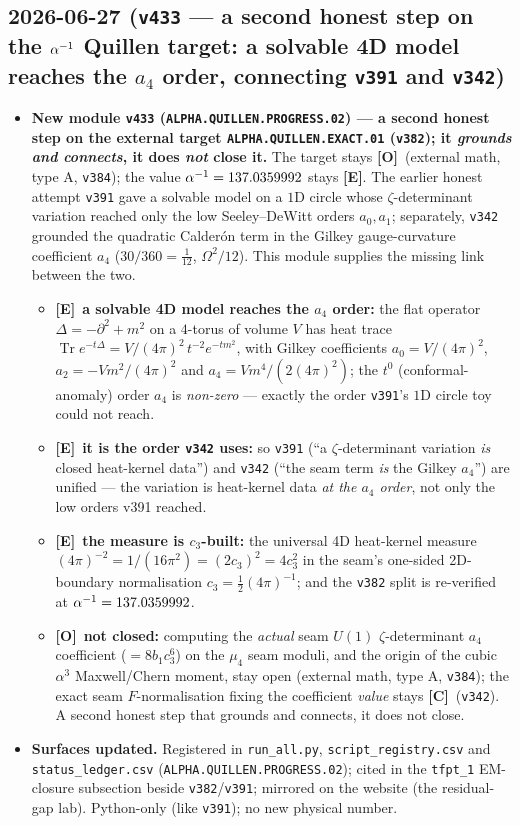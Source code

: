 \documentclass[11pt]{article}
\providecommand{\mE}{\textbf{[E]}}\providecommand{\mC}{\textbf{[C]}}
\providecommand{\mO}{\textbf{[O]}}\providecommand{\mX}{\textbf{[X]}}
\providecommand{\vref}[1]{\texttt{#1}}
\providecommand{\cthree}{c_3}\providecommand{\phiz}{\varphi_0^{\mathrm{ret}}}
\begin{document}
\subsection*{2026-06-27 (\texttt{v433} --- a second honest step on the $\alpha^{-1}$ Quillen target: a solvable 4D model reaches the $a_4$ order, connecting \texttt{v391} and \texttt{v342})}
\begin{itemize}
\item \textbf{New module \texttt{v433} (\texttt{ALPHA.QUILLEN.PROGRESS.02}) --- a second honest step on the
external target \texttt{ALPHA.QUILLEN.EXACT.01} (\vref{v382}); it \emph{grounds and connects}, it does
\emph{not} close it.} The target stays \mO\ (external math, type A, \vref{v384}); the value $\alpha^{-1}=137.0359992$
stays \mE. The earlier honest attempt \vref{v391} gave a solvable model on a $1$D circle whose
$\zeta$-determinant variation reached only the low Seeley--DeWitt orders $a_0,a_1$; separately, \vref{v342}
grounded the quadratic Calder\'on term in the Gilkey gauge-curvature coefficient $a_4$ ($30/360=\tfrac1{12}$,
$\Omega^2/12$). This module supplies the missing link between the two.
\begin{itemize}
\item \mE\ \textbf{a solvable 4D model reaches the $a_4$ order:} the flat operator $\Delta=-\partial^2+m^2$ on a
$4$-torus of volume $V$ has heat trace $\operatorname{Tr}e^{-t\Delta}=V/(4\pi)^2\,t^{-2}e^{-tm^2}$, with Gilkey
coefficients $a_0=V/(4\pi)^2$, $a_2=-Vm^2/(4\pi)^2$ and $a_4=Vm^4/(2(4\pi)^2)$; the $t^0$ (conformal-anomaly)
order $a_4$ is \emph{non-zero} --- exactly the order \vref{v391}'s $1$D circle toy could not reach.
\item \mE\ \textbf{it is the order \vref{v342} uses:} so \vref{v391} (``a $\zeta$-determinant variation \emph{is}
closed heat-kernel data'') and \vref{v342} (``the seam term \emph{is} the Gilkey $a_4$'') are unified --- the
variation is heat-kernel data \emph{at the $a_4$ order}, not only the low orders v391 reached.
\item \mE\ \textbf{the measure is $\cthree$-built:} the universal 4D heat-kernel measure
$(4\pi)^{-2}=1/(16\pi^2)=(2\cthree)^2=4\cthree^2$ in the seam's one-sided 2D-boundary normalisation
$\cthree=\tfrac12(4\pi)^{-1}$; and the \vref{v382} split is re-verified at $\alpha^{-1}=137.0359992$.
\item \mO\ \textbf{not closed:} computing the \emph{actual} seam $U(1)$ $\zeta$-determinant $a_4$ coefficient
($=8b_1\cthree^6$) on the $\mu_4$ seam moduli, and the origin of the cubic $\alpha^3$ Maxwell/Chern moment, stay
open (external math, type A, \vref{v384}); the exact seam $F$-normalisation fixing the coefficient \emph{value}
stays \mC\ (\vref{v342}). A second honest step that grounds and connects, it does not close.
\end{itemize}
\item \textbf{Surfaces updated.} Registered in \texttt{run\_all.py}, \texttt{script\_registry.csv} and
\texttt{status\_ledger.csv} (\texttt{ALPHA.QUILLEN.PROGRESS.02}); cited in the \texttt{tfpt\_1} EM-closure
subsection beside \vref{v382}/\vref{v391}; mirrored on the website (the residual-gap lab). Python-only (like
\vref{v391}); no new physical number.
\end{itemize}
\end{document}

